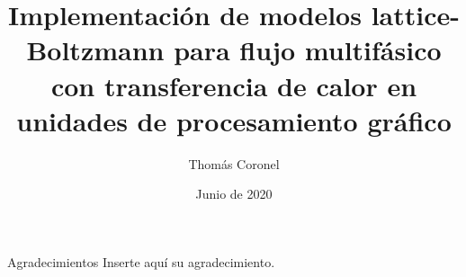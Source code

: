\documentclass[12pt,screen,oneside,pagebackref]{ibtesis}
\title{Implementaci\'on de modelos lattice-Boltzmann para flujo multif\'asico con transferencia de calor en unidades de procesamiento gr\'afico}
\author{Thom\'as Coronel}
\date{Junio de 2020}
\begin{document}


\begin{preliminary}





\tableofcontents                %



%
%

\end{preliminary}

%

%
%
%
%
%
%
%

\appendix
%
%
%

\begin{biblio}

\end{biblio}


\begin{seccion}{Agradecimientos}
Inserte aquí su agradecimiento.

\end{seccion}
\end{document}
